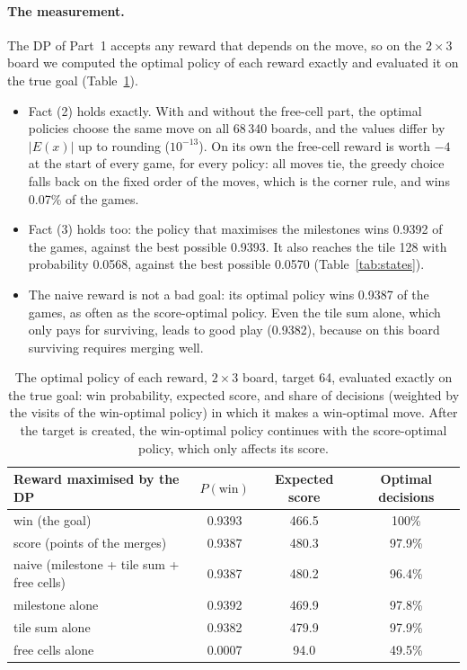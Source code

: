 \documentclass[11pt,a4paper]{article}
\theoremstyle{remark}
\begin{document}
\paragraph{The measurement.} The DP of Part~1 accepts any reward that depends on the move, so on the $2\times3$ board we computed the optimal policy of each reward exactly and evaluated it on the true goal (Table~\ref{tab:reward}).
\begin{itemize}[leftmargin=*]
\item Fact (2) holds exactly. With and without the free-cell part, the optimal policies choose the same move on all 68\,340 boards, and the values differ by $|E(x)|$ up to rounding ($10^{-13}$). On its own the free-cell reward is worth $-4$ at the start of every game, for every policy: all moves tie, the greedy choice falls back on the fixed order of the moves, which is the corner rule, and wins 0.07\% of the games.
\item Fact (3) holds too: the policy that maximises the milestones wins 0.9392 of the games, against the best possible 0.9393. It also reaches the tile 128 with probability 0.0568, against the best possible 0.0570 (Table~\ref{tab:states}).
\item The naive reward is not a bad goal: its optimal policy wins 0.9387 of the games, as often as the score-optimal policy. Even the tile sum alone, which only pays for surviving, leads to good play (0.9382), because on this board surviving requires merging well.
\end{itemize}

\begin{table}[ht]
\centering\small
\begin{tabular}{lccc}
\toprule
Reward maximised by the DP & $P(\text{win})$ & Expected score & Optimal decisions\\
\midrule
win (the goal)                      & 0.9393 & 466.5 & 100\%\\
score (points of the merges)        & 0.9387 & 480.3 & 97.9\%\\
naive (milestone + tile sum + free cells) & 0.9387 & 480.2 & 96.4\%\\
\quad milestone alone               & 0.9392 & 469.9 & 97.8\%\\
\quad tile sum alone                & 0.9382 & 479.9 & 97.9\%\\
\quad free cells alone              & 0.0007 & 94.0 & 49.5\%\\
\bottomrule
\end{tabular}
\caption{The optimal policy of each reward, $2\times3$ board, target 64, evaluated exactly on the true goal: win probability, expected score, and share of decisions (weighted by the visits of the win-optimal policy) in which it makes a win-optimal move. After the target is created, the win-optimal policy continues with the score-optimal policy, which only affects its score.}
\label{tab:reward}
\end{table}
\end{document}

